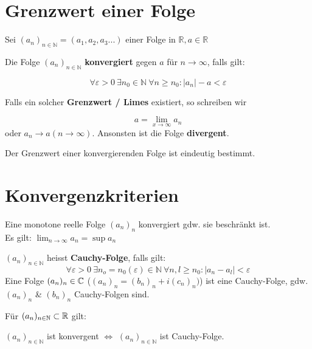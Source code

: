 \section{Grenzwert einer Folge}
	Sei $(a_n)_{n\in \mathbb{N}}=(a_1,a_2,a_3...)$ einer Folge in $\mathbb{R}, a \in \mathbb{R}$\\
	
	\begin{definition}[Konvergenz]
    Die Folge $(a_n)_{n\in \mathbb{N}}$\textbf{ konvergiert} gegen $a$ für $n \rightarrow \infty$, falls gilt:
	
		$$\forall \varepsilon > 0 \ \exists n_0\in \mathbb{N} \ \forall n \geq n_0:|a_n|-a < \varepsilon$$
		
		\raggedright{Falls ein solcher \textbf{Grenzwert / Limes} existiert, so schreiben wir}
		
		$$a = \lim_{x \to \infty}  a_n$$
        oder $a_n \rightarrow a (n\rightarrow \infty)$.
        Ansonsten ist die Folge \textbf{divergent}.
	\end{definition}
	
    \begin{theorem}
    	Der Grenzwert einer konvergierenden Folge ist eindeutig bestimmt.
    \end{theorem}
    
\section{Konvergenzkriterien}
	
	\begin{definition}
    	Eine monotone reelle Folge $(a_n)_n$ konvergiert gdw. sie beschränkt ist.\\
        Es gilt: $\lim_{n\to\infty} a_n = \sup a_n$
	\end{definition}
	
    	\noindent\begin{definition}
	\noindent $(a_n)_{n\in \mathbb{N}}$ heisst \textbf{Cauchy-Folge}, falls gilt:
		$$\forall \varepsilon > 0\ \exists n_o = n_0(\varepsilon) \in \mathbb{N}\ \forall n,l \geq n_0 : |a_n-a_l| < \varepsilon$$
       	Eine Folge $(a_n)_n \in \mathbb{C}$ ($(a_n)_n = (b_n)_n + i(c_n)_n)$) ist eine Cauchy-Folge, gdw. $(a_n)_n$ \& $(b_n)_n$ Cauchy-Folgen sind.
	\end{definition}

\begin{theorem}

Für $(a_n)_{n\in \mathbb{N}} \subset \mathbb{R}$ gilt:

$(a_n)_{n\in \mathbb{N}}$ ist konvergent $\Longleftrightarrow$
$(a_n)_{n\in \mathbb{N}}$ ist Cauchy-Folge.
\end{theorem}

